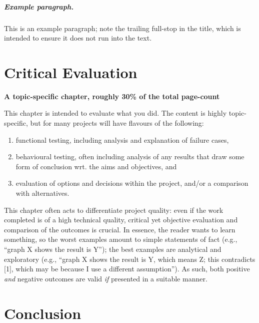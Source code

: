 \documentclass[ %
                    author={Carlos Duran Calle},
                supervisor={Dr. Felipe Campelo},
                    degree={MSc},
                     title={Comparative Machine Learning Analysis for Student Dropout Prediction in a Virtual Learning Environment},
                  subtitle={Incorporating Student Engagement and Socio-Economic Features},
                      type={},
                      year={2025}]{dissertation}
\begin{document}
\paragraph{Example paragraph.}

This is an example paragraph; note the trailing full-stop in the title,
which is intended to ensure it does not run into the text.


\chapter{Critical Evaluation}
\label{chap:evaluation}

{\bf A topic-specific chapter, roughly 30\% of the total page-count} 
\vspace{1cm} 

\noindent
This chapter is intended to evaluate what you did.  The content is highly 
topic-specific, but for many projects will have flavours of the following:

\begin{enumerate}
\item functional  testing, including analysis and explanation of failure 
      cases,
\item behavioural testing, often including analysis of any results that 
      draw some form of conclusion wrt. the aims and objectives,
      and
\item evaluation of options and decisions within the project, and/or a
      comparison with alternatives.
\end{enumerate}

\noindent
This chapter often acts to differentiate project quality: even if the work
completed is of a high technical quality, critical yet objective evaluation 
and comparison of the outcomes is crucial.  In essence, the reader wants to
learn something, so the worst examples amount to simple statements of fact 
(e.g., ``graph X shows the result is Y''); the best examples are analytical 
and exploratory (e.g., ``graph X shows the result is Y, which means Z; this 
contradicts [1], which may be because I use a different assumption'').  As 
such, both positive {\em and}\/ negative outcomes are valid {\em if} presented 
in a suitable manner.


\chapter{Conclusion}
\label{chap:conclusion}
\end{document}

